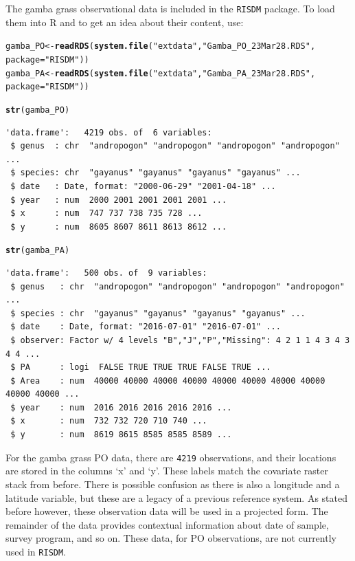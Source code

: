 \documentclass[article,shortnames,nojss]{jss}\usepackage[]{graphicx}\usepackage[]{xcolor}
\makeatletter
\newcommand{\hlstr}[1]{\textcolor[rgb]{0.192,0.494,0.8}{#1}}%
\newcommand{\hlstd}[1]{\textcolor[rgb]{0.345,0.345,0.345}{#1}}%
\newcommand{\hlkwb}[1]{\textcolor[rgb]{0.69,0.353,0.396}{#1}}%
\newcommand{\hlkwc}[1]{\textcolor[rgb]{0.333,0.667,0.333}{#1}}%
\newcommand{\hlkwd}[1]{\textcolor[rgb]{0.737,0.353,0.396}{\textbf{#1}}}%
\newenvironment{kframe}{%
 \def\at@end@of@kframe{}%
 \ifinner\ifhmode%
  \def\at@end@of@kframe{\end{minipage}}%
  \begin{minipage}{\columnwidth}%
 \fi\fi%
 \def\FrameCommand##1{\hskip\@totalleftmargin \hskip-\fboxsep
 \colorbox{shadecolor}{##1}\hskip-\fboxsep
     \hskip-\linewidth \hskip-\@totalleftmargin \hskip\columnwidth}%
 \MakeFramed {\advance\hsize-\width
   \@totalleftmargin\z@ \linewidth\hsize
   \@setminipage}}%
 {\par\unskip\endMakeFramed%
 \at@end@of@kframe}
\newenvironment{knitrout}{}{} %
\makeatother
\begin{document}
The gamba grass observational data is included in the \texttt{RISDM} package. To load them into R and to get an idea about their content, use:
\begin{knitrout}
\color{fgcolor}\begin{kframe}
\begin{alltt}
\hlstd{gamba_PO} \hlkwb{<-} \hlkwd{readRDS}\hlstd{(} \hlkwd{system.file}\hlstd{(}\hlstr{"extdata"}\hlstd{,} \hlstr{"Gamba_PO_23Mar28.RDS"}\hlstd{,}
                                   \hlkwc{package}\hlstd{=}\hlstr{"RISDM"}\hlstd{))}
\hlstd{gamba_PA} \hlkwb{<-} \hlkwd{readRDS}\hlstd{(} \hlkwd{system.file}\hlstd{(}\hlstr{"extdata"}\hlstd{,} \hlstr{"Gamba_PA_23Mar28.RDS"}\hlstd{,}
                                 \hlkwc{package}\hlstd{=}\hlstr{"RISDM"}\hlstd{))}

\hlkwd{str}\hlstd{( gamba_PO)}
\end{alltt}
\begin{verbatim}
'data.frame':	4219 obs. of  6 variables:
 $ genus  : chr  "andropogon" "andropogon" "andropogon" "andropogon" ...
 $ species: chr  "gayanus" "gayanus" "gayanus" "gayanus" ...
 $ date   : Date, format: "2000-06-29" "2001-04-18" ...
 $ year   : num  2000 2001 2001 2001 2001 ...
 $ x      : num  747 737 738 735 728 ...
 $ y      : num  8605 8607 8611 8613 8612 ...
\end{verbatim}
\begin{alltt}
\hlkwd{str}\hlstd{( gamba_PA)}
\end{alltt}
\begin{verbatim}
'data.frame':	500 obs. of  9 variables:
 $ genus   : chr  "andropogon" "andropogon" "andropogon" "andropogon" ...
 $ species : chr  "gayanus" "gayanus" "gayanus" "gayanus" ...
 $ date    : Date, format: "2016-07-01" "2016-07-01" ...
 $ observer: Factor w/ 4 levels "B","J","P","Missing": 4 2 1 1 4 3 4 3 4 4 ...
 $ PA      : logi  FALSE TRUE TRUE TRUE FALSE TRUE ...
 $ Area    : num  40000 40000 40000 40000 40000 40000 40000 40000 40000 40000 ...
 $ year    : num  2016 2016 2016 2016 2016 ...
 $ x       : num  732 732 720 710 740 ...
 $ y       : num  8619 8615 8585 8585 8589 ...
\end{verbatim}
\end{kframe}
\end{knitrout}
  
For the gamba grass PO data, there are \verb|4219| observations, and their locations are stored in the columns `x' and `y'. These labels match the covariate raster stack from before. There is possible confusion as there is also a longitude and a latitude variable, but these are a legacy of a previous reference system. As stated before however, these observation data will be used in a projected form. The remainder of the data provides contextual information about date of sample, survey program, and so on. These data, for PO observations, are not currently used in \texttt{RISDM}.
\end{document}
